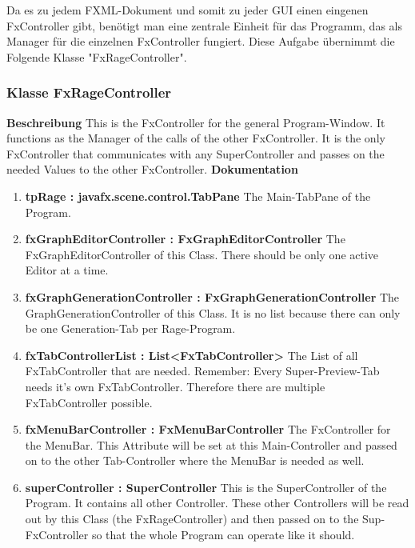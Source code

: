 \documentclass{article}
\newcommand{\myclass}[1]{\subsubsection*{Klasse #1} \label{#1} \addcontentsline{toc}{subsubsection}{\nameref{#1}}}
\begin{document}
			Da es zu jedem FXML-Dokument und somit zu jeder GUI einen eingenen FxController gibt, benötigt man eine zentrale Einheit für das Programm, das als Manager für die einzelnen FxController fungiert.
			Diese Aufgabe übernimmt die Folgende Klasse "FxRageController".
			
			\myclass{FxRageController}
				\textbf{Beschreibung}
				This is the FxController for the general Program-Window.
				It functions as the Manager of the calls of the other FxController.
				It is the only FxController that communicates with any SuperController and passes on the needed Values to the other FxController.
				\textbf{Dokumentation}
				\begin{enumerate}[-]
					\item{
						\textbf{tpRage : javafx.scene.control.TabPane} \newline
						The Main-TabPane of the Program.
					}
					\item{
						\textbf{fxGraphEditorController : FxGraphEditorController} \newline
						The FxGraphEditorController of this Class.
						There should be only one active Editor at a time.
					}
					\item{
						\textbf{fxGraphGenerationController : FxGraphGenerationController} \newline
						The GraphGenerationController of this Class.
						It is no list because there can only be one Generation-Tab per Rage-Program.
					}
					\item{
						\textbf{fxTabControllerList : List<FxTabController>} \newline
						The List of all FxTabController that are needed.
						Remember:
						Every Super-Preview-Tab needs it's own FxTabController.
						Therefore there are multiple FxTabController possible.
					}
					\item{
						\textbf{fxMenuBarController : FxMenuBarController} \newline
						The FxController for the MenuBar.
						This Attribute will be set at this Main-Controller and passed on to the other Tab-Controller where the MenuBar is needed as well.
					}
					\item{
						\textbf{superController : SuperController} \newline
						This is the SuperController of the Program.
						It contains all other Controller.
						These other Controllers will be read out by this Class (the FxRageController) and then passed on to the Sup-FxController so that the whole Program can operate like it should.
					}
				\end{enumerate}
\end{document}
